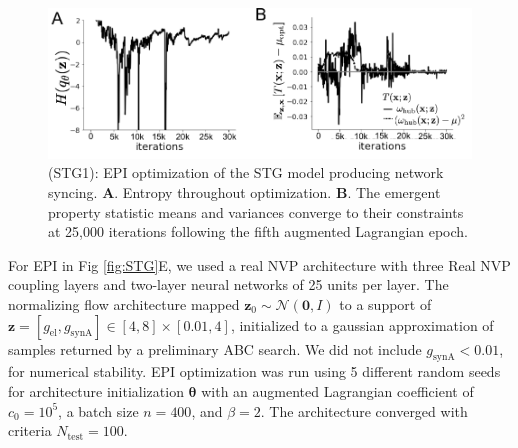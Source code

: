 \documentclass[11pt]{article}
\begin{document}
\begin{figure}
\begin{center}
\includegraphics[scale=0.8]{figures/figSTG1/figSTG1.pdf}
\end{center}
\begin{flushleft}
\caption{\small (STG1): EPI optimization of the STG model producing network syncing. 
\textbf{A}. Entropy throughout optimization. 
\textbf{B}. The emergent property statistic means and variances converge to their constraints at 25,000 iterations following the fifth augmented Lagrangian epoch.}
\end{flushleft}
\label{fig:STG1}
\end{figure}

For EPI in Fig \ref{fig:STG}E, we used a real NVP architecture with three Real NVP coupling layers and two-layer neural networks of 25 units per layer.
The normalizing flow architecture mapped $\mathbf{z}_0 \sim \mathcal{N}(\mathbf{0}, I)$ to a support of $\mathbf{z} = [g_{\text{el}}, g_{\text{synA}}] \in [4,8] \times [0.01,4]$, initialized to a gaussian approximation of samples returned by a preliminary ABC search.
We did not include $g_{\text{synA}} < 0.01$, for numerical stability.
EPI optimization was run using 5 different random seeds for architecture initialization $\bm{\theta}$ with an augmented Lagrangian coefficient of $c_0 = 10^{5}$, a batch size $n=400$, and $\beta = 2$.
The architecture converged with criteria $N_{\text{test}} = 100$.
\end{document}

